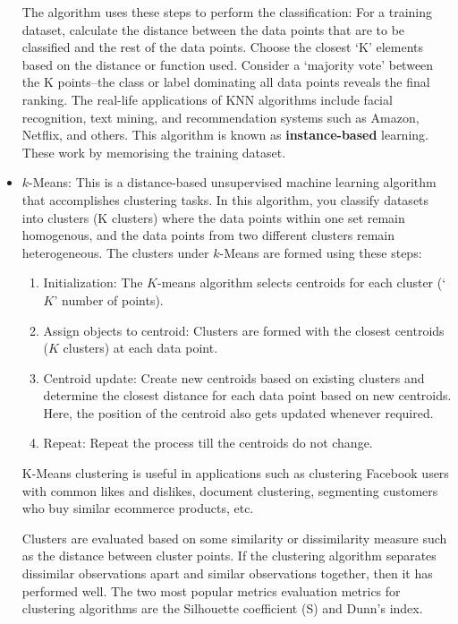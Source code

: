 \documentclass[11pt]{article}
\begin{document}
\begin{itemize}
The algorithm uses these steps to perform the classification:
For a training dataset, calculate the distance between the data points that are to be classified and the rest of the data points.
Choose the closest ‘K’ elements based on the distance or function used.
Consider a ‘majority vote’ between the K points–the class or label dominating all data points reveals the final ranking. 
The real-life applications of KNN algorithms include facial recognition, text mining, and recommendation systems such as Amazon, Netflix, and others.
This algorithm is known as \textbf{instance-based} learning. These work by memorising the training dataset. 

\item $k$-Means: This is a distance-based unsupervised machine learning algorithm that accomplishes clustering tasks. In this algorithm, you classify datasets into clusters (K clusters) where the data 
points within one set remain homogenous, and the data points from two different clusters remain heterogeneous. The clusters under $k$-Means are formed using these steps:
\begin{enumerate} 
\item Initialization: The $K$-means algorithm selects centroids for each cluster (‘$K$’ number of points).
\item Assign objects to centroid: Clusters are formed with the closest centroids ($K$ clusters) at each data point.
\item Centroid update: Create new centroids based on existing clusters and determine the closest distance for each data point based on new centroids. Here, the position of the centroid also gets updated whenever required.
\item Repeat: Repeat the process till the centroids do not change.
\end{enumerate} 
K-Means clustering is useful in applications such as clustering Facebook users with common likes and dislikes, document clustering, segmenting customers who buy similar ecommerce products, etc.

Clusters are evaluated based on some similarity or dissimilarity measure such as the distance between cluster points. If the clustering algorithm separates dissimilar observations apart and similar observations together, then it has performed well. The two most popular metrics evaluation metrics for clustering algorithms are the Silhouette coefficient (S) and Dunn's index. 







\end{itemize}
\end{document}
